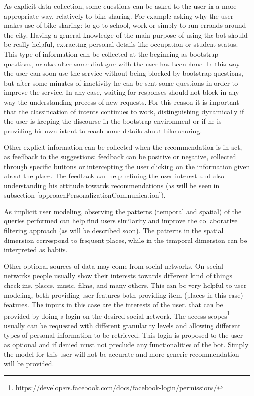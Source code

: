 As explicit data collection, some questions can be asked to the user in a more appropriate way, relatively to bike sharing. For example asking why the user makes use of bike sharing: to go to school, work or simply to run errands around the city. Having a general knowledge of the main purpose of using the bot should be really helpful, extracting personal details like occupation or student status. This type of information can be collected at the beginning as bootstrap questions, or also after some dialogue with the user has been done. In this way the user can soon use the service without being blocked by bootstrap questions, but after some minutes of inactivity he can be sent some questions in order to improve the service. In any case, waiting for responses should not block in any way the understanding process of new requests. For this reason it is important that the classification of intents continues to work, distinguishing dynamically if the user is keeping the discourse in the bootstrap environment or if he is providing his own intent to reach some details about bike sharing. 

Other explicit information can be collected when the recommendation is in act, as feedback to the suggestions: feedback can be positive or negative, collected through specific buttons or intercepting the user clicking on the information given about the place. The feedback can help refining the user interest and also understanding his attitude towards recommendations (as will be seen in subsection \ref{approachPersonalizationCommunication}).

As implicit user modeling, observing the patterns (temporal and spatial) of the queries performed can help find users similarity and improve the collaborative filtering approach (as will be described soon). The patterns in the spatial dimension correspond to frequent places, while in the temporal dimension can be interpreted as habits.

Other optional sources of data may come from social networks. On social networks people usually show their interests towards different kind of things: check-ins, places, music, films, and many others. This can be very helpful to user modeling, both providing user features both providing item (places in this case) features. The inputs in this case are the interests of the user, that can be provided by doing a login on the desired social network. The access scopes\footnote{\url{https://developers.facebook.com/docs/facebook-login/permissions/}} usually can be requested with different granularity levels and allowing different types of personal information to be retrieved. This login is proposed to the user as optional and if denied must not preclude any functionalities of the bot. Simply the model for this user will not be accurate and more generic recommendation will be provided.

